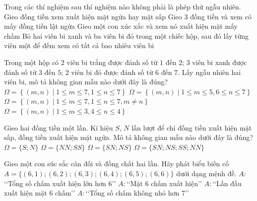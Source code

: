 \begin{ex}%
	Trong các thí nghiệm sau thí nghiệm nào không phải là phép thử ngẫu nhiên.
	\choice
	{Gieo đồng tiền xem xuất hiện mặt ngửa hay mặt sấp}
	{Gieo 3 đồng tiền và xem có mấy đồng tiền lật ngửa}
	{Gieo một con xúc xắc và xem nó xuất hiện mặt mấy chấm}
	{\True Bỏ hai viên bi xanh và ba viên bi đỏ trong một chiếc hộp, sau đó lấy từng viên một để đếm xem có tất cả bao nhiêu viên bi}
\end{ex}
\begin{ex}%
	Trong một hộp có 
	$2$ viên bi trắng được đánh số từ $1$ đến $2$;
	$3$ viên bi xanh được đánh số từ $3$ đến $5$;
	$2$ viên bi đỏ được đánh số từ $6$ đến $7$.
	Lấy ngẫu nhiên hai viên bi, mô tả không gian mẫu nào dưới đây là đúng?
	\choice
	{$\Omega = \left\{\left(m, n\right)\mid 1 \le m \le 7, 1 \le n \le 7\right\}$}
	{$\Omega = \left\{\left(m, n\right)\mid 1 \le m \le 5, 6 \le n \le 7\right\}$}
	{\True $\Omega = \left\{\left(m, n\right)\mid 1 \le m \le 7, 1 \le n \le 7, m \ne n\right\}$}
	{$\Omega = \left\{\left(m, n\right)\mid 1 \le m \le 3, 4 \le n \le 4\right\}$}
\end{ex}
\begin{ex} %
	Gieo hai đồng tiền một lần. Kí hiệu $S$, $N$ lần lượt để chỉ đồng tiền xuất hiện mặt sấp, đồng tiền xuất hiện mặt ngửa. Mô tả không gian mẫu nào dưới đây là đúng?
	\choice
	{$\Omega=\{S; N\}$}
	{$\Omega=\{NN; SS\}$}
	{$\Omega=\{SN; NS\}$}
	{\True $\Omega=\{SN; NS; SS; NN\}$}
\end{ex}


\begin{ex}%
	Gieo một con súc sắc cân đối và đồng chất hai lần. Hãy phát biểu biến cố $ A=\{(6, 1); (6, 2); (6, 3); (6,4); (6, 5); (6, 6)\} $ dưới dạng mệnh đề.
	\choice
	{$ A\colon$\lq\lq Tổng số chấm xuất hiện lớn hơn $ 6 $\rq\rq}
	{$ A\colon$\lq\lq Mặt $ 6 $ chấm xuất hiện\rq\rq}
	{\True $ A\colon$\lq\lq Lần đầu xuất hiện mặt $ 6 $ chấm\rq\rq}
	{$ A\colon$\lq\lq Tổng số chấm không nhỏ hơn $ 7 $\rq\rq}
\end{ex}


